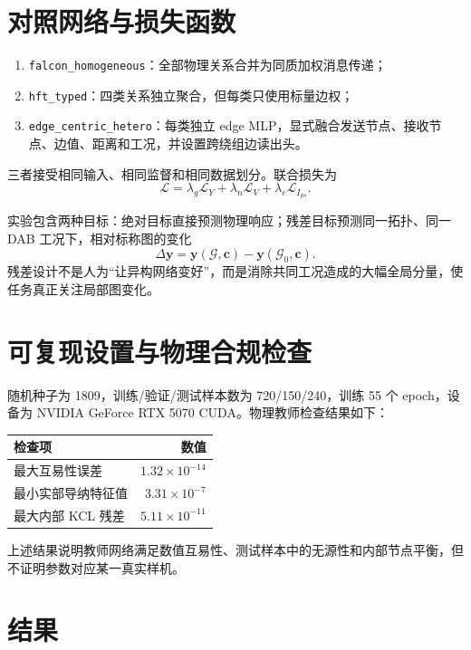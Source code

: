 \documentclass[11pt,a4paper]{ctexart}
\begin{document}
\section{对照网络与损失函数}
\begin{enumerate}
 \item \texttt{falcon\_homogeneous}：全部物理关系合并为同质加权消息传递；
 \item \texttt{hft\_typed}：四类关系独立聚合，但每类只使用标量边权；
 \item \texttt{edge\_centric\_hetero}：每类独立 edge MLP，显式融合发送节点、接收节点、边值、距离和工况，并设置跨绕组边读出头。
\end{enumerate}
三者接受相同输入、相同监督和相同数据划分。联合损失为
\begin{equation}
 \mathcal L=\lambda_g\mathcal L_Y+\lambda_n\mathcal L_V+\lambda_e\mathcal L_{I_{ps}}.
\end{equation}

实验包含两种目标：绝对目标直接预测物理响应；残差目标预测同一拓扑、同一 DAB 工况下，相对标称图的变化
\begin{equation}
 \Delta\bm y=\bm y(\mathcal G,\bm c)-\bm y(\mathcal G_0,\bm c).
\end{equation}
残差设计不是人为“让异构网络变好”，而是消除共同工况造成的大幅全局分量，使任务真正关注局部图变化。

\section{可复现设置与物理合规检查}
随机种子为 1809，训练/验证/测试样本数为 720/150/240，训练 55 个 epoch，设备为 NVIDIA GeForce RTX 5070 CUDA。物理教师检查结果如下：
\begin{center}
\begin{tabular}{lr}
\toprule
检查项 & 数值\\
\midrule
最大互易性误差 & $1.32\times10^{-14}$\\
最小实部导纳特征值 & $3.31\times10^{-7}$\\
最大内部 KCL 残差 & $5.11\times10^{-11}$\\
\bottomrule
\end{tabular}
\end{center}
上述结果说明教师网络满足数值互易性、测试样本中的无源性和内部节点平衡，但不证明参数对应某一真实样机。

\section{结果}
\end{document}
